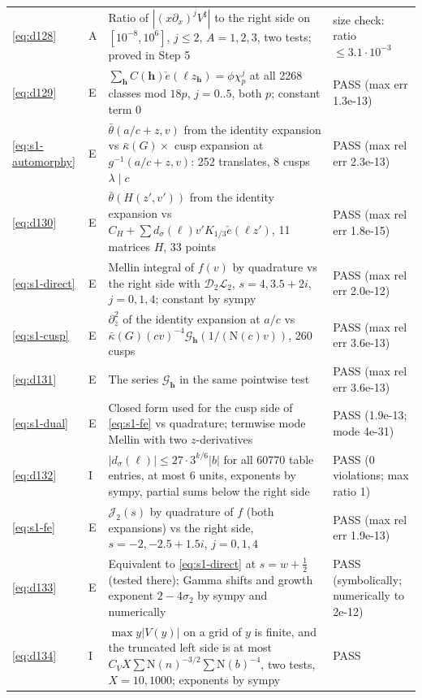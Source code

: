 \documentclass[11pt]{article}
\numberwithin{equation}{section}
\newcommand{\N}{\mathrm N}
\newcommand{\ce}{\check e}
\begin{document}
\begin{longtable}{@{}>{\raggedright\arraybackslash}p{1.2cm}>{\centering\arraybackslash}p{0.7cm}>{\raggedright\arraybackslash}p{9.05cm}>{\raggedright\arraybackslash}p{4.3cm}@{}}
\eqref{eq:d128} & A & Ratio of $|(x\partial_x)^jV^\sharp|$ to the right side on $[10^{-8},10^6]$, $j\le2$, $A=1,2,3$, two tests; proved in Step 5 & size check: ratio $\le3.1\cdot10^{-3}$\\
\eqref{eq:d129} & E & $\sum_{\mathbf h}C(\mathbf h)\ce(\ell z_{\mathbf h})=\phi\chi_p^j$ at all 2268 classes mod $18p$, $j=0..5$, both $p$; constant term 0 & PASS (max err 1.3e-13)\\
\eqref{eq:s1-automorphy} & E & $\bar\theta(a/c+z,v)$ from the identity expansion vs $\bar\kappa(G)\times$ cusp expansion at $g^{-1}(a/c+z,v)$: 252 translates, 8 cusps $\lambda\mid c$ & PASS (max rel err 2.3e-13)\\
\eqref{eq:d130} & E & $\bar\theta(H(z',v'))$ from the identity expansion vs $C_H+\sum d_\sigma(\ell)v'K_{1/3}\ce(\ell z')$, 11 matrices $H$, 33 points & PASS (max rel err 1.8e-15)\\
\eqref{eq:s1-direct} & E & Mellin integral of $f(v)$ by quadrature vs the right side with $\mathcal D_2\mathcal L_2$, $s=4,3.5+2i$, $j=0,1,4$; constant by sympy & PASS (max rel err 2.0e-12)\\
\eqref{eq:s1-cusp} & E & $\partial_{\bar z}^2$ of the identity expansion at $a/c$ vs $\bar\kappa(G)(cv)^{-4}\mathcal G_{\mathbf h}(1/(\N(c)v))$, 260 cusps & PASS (max rel err 3.6e-13)\\
\eqref{eq:d131} & E & The series $\mathcal G_{\mathbf h}$ in the same pointwise test & PASS (max rel err 3.6e-13)\\
\eqref{eq:s1-dual} & E & Closed form used for the cusp side of \eqref{eq:s1-fe} vs quadrature; termwise mode Mellin with two $z$-derivatives & PASS (1.9e-13; mode 4e-31)\\
\eqref{eq:d132} & I & $|d_\sigma(\ell)|\le27\cdot3^{k/6}|b|$ for all 60770 table entries, at most 6 units, exponents by sympy, partial sums below the right side & PASS (0 violations; max ratio 1)\\
\eqref{eq:s1-fe} & E & $\mathcal J_2(s)$ by quadrature of $f$ (both expansions) vs the right side, $s=-2,-2.5+1.5i$, $j=0,1,4$ & PASS (max rel err 1.9e-13)\\
\eqref{eq:d133} & E & Equivalent to \eqref{eq:s1-direct} at $s=w+\frac12$ (tested there); Gamma shifts and growth exponent $2-4\sigma_2$ by sympy and numerically & PASS (symbolically; numerically to 2e-12)\\
\eqref{eq:d134} & I & $\max y|V(y)|$ on a grid of $y$ is finite, and the truncated left side is at most $C_VX\sum\N(n)^{-3/2}\sum\N(b)^{-4}$, two tests, $X=10,1000$; exponents by sympy & PASS\\

\end{longtable}
\end{document}
